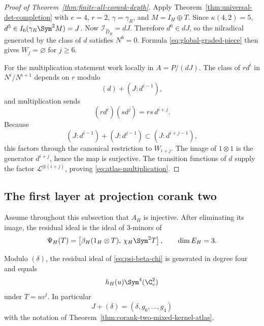 \begin{proof}[Proof of Theorem~\ref{thm:finite-all-corank-depth}]
Apply Theorem~\ref{thm:universal-det-completion} with
\(e=4\), \(r=2\), \(\gamma=\gamma_R\), and
\(M=I_H\oplus T\).  Since \(\kappa(4,2)=5\),
\(d^5\in I_6(\gamma_R\Sym^2M)=J\).
Now \(\mathcal I_{\widehat D_R}=dJ\).  Therefore
\(d^6\in dJ\), so the nilradical generated by the class of \(d\)
satisfies \(N^6=0\).  Formula
\eqref{eq:global-graded-piece} then gives \(W_j=\varnothing\) for
\(j\ge6\).

For the multiplication statement work locally in
\(A=P/(dJ)\).  The class of \(rd^i\) in
\(N^i/N^{i+1}\) depends on \(r\) modulo
\[
 (d)+(J:d^{i-1}),
\]
and multiplication sends
\[
 (rd^i)(sd^j)=rs\,d^{i+j}.
\]
Because
\[
 (J:d^{i-1})+(J:d^{j-1})
 \subset (J:d^{i+j-1}),
\]
this factors through the canonical restriction to \(W_{i+j}\).
The image of \(1\otimes1\) is the generator \(d^{i+j}\), hence the
map is surjective.  The transition functions of \(d\) supply the
factor \(\mathcal L^{\otimes(i+j)}\), proving
\eqref{eq:atlas-multiplication}.
\end{proof}

\subsection{The first layer at projection corank two}

Assume throughout this subsection that \(A_H\) is injective.  After
eliminating its image, the residual ideal is the ideal of \(3\)-minors
of
\begin{equation}\label{eq:psi-beta-chi}
 \Psi_H(T)=
 \left[
   \beta_H(1_H\otimes T),\,
   \chi_H\Sym^2T
 \right],
 \qquad \dim E_H=3.
\end{equation}

\begin{lemma}
\label{lem:contact-symbol-all-Ainj}
Modulo \((\delta)\), the residual ideal of
\eqref{eq:psi-beta-chi} is generated in degree four and equals
\[
 h_H(u)\Sym^4(\C^2_v)
\]
under \(T=uv^t\).  In particular
\[
 J+(\delta)=(\delta,g_0,\ldots,g_4)
\]
with the notation of
Theorem~\ref{thm:corank-two-mixed-kernel-atlas}.
\end{lemma}


